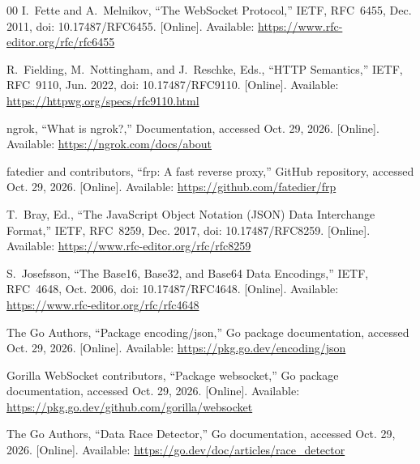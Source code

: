 \documentclass[conference,letterpaper]{IEEEtran}
\begin{document}
\begin{thebibliography}{00}
I.~Fette and A.~Melnikov, ``The WebSocket Protocol,'' IETF, RFC~6455,
Dec. 2011, doi: 10.17487/RFC6455.
[Online]. Available: \url{https://www.rfc-editor.org/rfc/rfc6455}

R.~Fielding, M.~Nottingham, and J.~Reschke, Eds., ``HTTP Semantics,''
IETF, RFC~9110, Jun. 2022, doi: 10.17487/RFC9110.
[Online]. Available: \url{https://httpwg.org/specs/rfc9110.html}

ngrok, ``What is ngrok?,'' Documentation, accessed Oct. 29, 2026.
[Online]. Available: \url{https://ngrok.com/docs/about}

fatedier and contributors, ``frp: A fast reverse proxy,'' GitHub repository,
accessed Oct. 29, 2026.
[Online]. Available: \url{https://github.com/fatedier/frp}

T.~Bray, Ed., ``The JavaScript Object Notation (JSON) Data Interchange
Format,'' IETF, RFC~8259, Dec. 2017, doi: 10.17487/RFC8259.
[Online]. Available: \url{https://www.rfc-editor.org/rfc/rfc8259}

S.~Josefsson, ``The Base16, Base32, and Base64 Data Encodings,'' IETF,
RFC~4648, Oct. 2006, doi: 10.17487/RFC4648.
[Online]. Available: \url{https://www.rfc-editor.org/rfc/rfc4648}

The Go Authors, ``Package encoding/json,'' Go package documentation,
accessed Oct. 29, 2026.
[Online]. Available: \url{https://pkg.go.dev/encoding/json}

Gorilla WebSocket contributors, ``Package websocket,'' Go package
documentation, accessed Oct. 29, 2026.
[Online]. Available: \url{https://pkg.go.dev/github.com/gorilla/websocket}

The Go Authors, ``Data Race Detector,'' Go documentation, accessed Oct. 29,
2026. [Online]. Available: \url{https://go.dev/doc/articles/race_detector}
\end{thebibliography}
\end{document}
